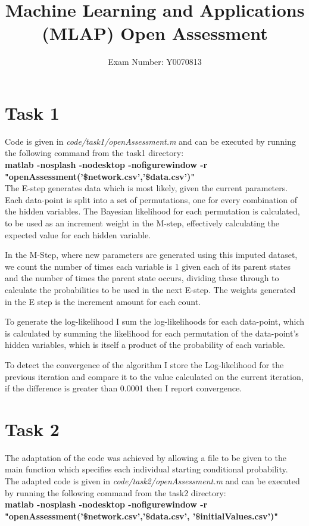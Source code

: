 \documentclass{article}
\begin{document}
\title{Machine Learning and Applications (MLAP) Open Assessment}
\author{Exam Number: Y0070813}
\date{\vspace{-5ex}}
\maketitle
\section{Task 1}
Code is given in \textit{code/task1/openAssessment.m} and can be executed by running the following command from the task1 directory: \\
\textbf{matlab -nosplash -nodesktop -nofigurewindow -r "openAssessment('\$network.csv','\$data.csv')"}\\


The E-step generates data which is most likely, given the current parameters. Each data-point is split into a set of permutations, one for every combination of the hidden variables. The Bayesian likelihood for each permutation is calculated, to be used as an increment weight in the M-step, effectively calculating the expected value for each hidden variable.

In the M-Step, where new parameters are generated using this imputed dataset, we count the number of times each variable is 1 given each of its parent states and the number of times the parent state occurs, dividing these through to calculate the probabilities to be used in the next E-step. The weights generated in the E step is the increment amount for each count. 

To generate the log-likelihood I sum the log-likelihoods for each data-point, which is calculated by summing the likelihood for each permutation of the data-point's hidden variables, which is itself a product of the probability of each variable.

To detect the convergence of the algorithm I store the Log-likelihood for the previous iteration and compare it to the value calculated on the current iteration, if the difference is greater than 0.0001 then I report convergence.
\newpage
\section{Task 2}
The adaptation of the code was achieved by allowing a file to be given to the main function which specifies each individual starting conditional probability. The adapted code is given in \textit{code/task2/openAssessment.m} and can be executed by running the following command from the task2 directory:\\
\textbf{matlab -nosplash -nodesktop -nofigurewindow -r "openAssessment('\$network.csv','\$data.csv', '\$initialValues.csv')"} \\\\
\end{document}
